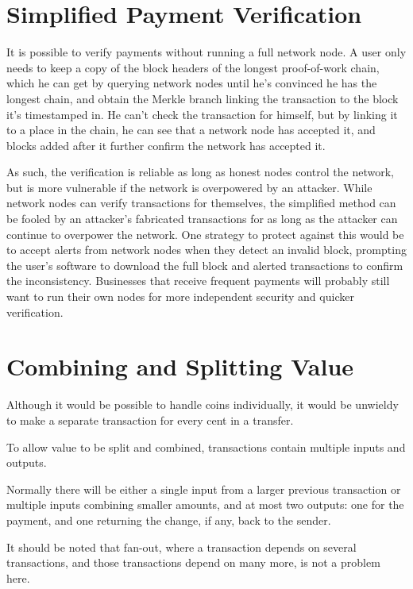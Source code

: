 \documentclass{article}
\begin{document}
\section{Simplified Payment Verification}

It is possible to verify payments without running a full network node. A user only needs to keep a copy of the block headers of the longest proof-of-work chain, which he can get by querying network nodes until he's convinced he has the longest chain, and obtain the Merkle branch linking the transaction to the block it's timestamped in. He can't check the transaction for himself, but by linking it to a place in the chain, he can see that a network node has accepted it, and blocks added after it further confirm the network has accepted it.

As such, the verification is reliable as long as honest nodes control the network, but is more vulnerable if the network is overpowered by an attacker. While network nodes can verify transactions for themselves, the simplified method can be fooled by an attacker's fabricated transactions for as long as the attacker can continue to overpower the network. One strategy to protect against this would be to accept alerts from network nodes when they detect an invalid block, prompting the user's software to download the full block and alerted transactions to confirm the inconsistency. Businesses that receive frequent payments will probably still want to run their own nodes for more independent security and quicker verification.

\section{Combining and Splitting Value}

Although it would be possible to handle coins individually, it would be unwieldy to make a separate transaction for every cent in a transfer.

To allow value to be split and combined, transactions contain multiple inputs and outputs.

Normally there will be either a single input from a larger previous transaction or multiple inputs combining smaller amounts, and at most two outputs: one for the payment, and one returning the change, if any, back to the sender.

It should be noted that fan-out, where a transaction depends on several transactions, and those transactions depend on many more, is not a problem here.
\end{document}
